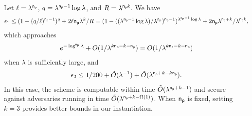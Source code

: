 

 Let $\ell=\lambda^{\mathsf{n_p}}$, $q=\lambda^{\mathsf{n_p}-1}\log\lambda$, and $R = \lambda^{\mathsf{n_p} k}$. We have 
$$\epsilon_1 \leq (1-(q/\ell)^{\mathsf{n_p}-1})^{q} + 2\ell\mathsf{n_p}\lambda^{k}/R = (1 - ((\lambda^{\mathsf{n_p}-1}\log\lambda)/\lambda^{\mathsf{n_p}})^{\mathsf{n_p}-1})^{\lambda^{\mathsf{n_p}-1}\log\lambda}+2\mathsf{n_p}\lambda^{\mathsf{n_p}+k}/\lambda^{\mathsf{n_p} k},$$ which approaches $$e^{-\log^{\mathsf{n_p}}\lambda} + O(1/\lambda^{k\mathsf{n_p}-k-\mathsf{n_p}}) = O(1/\lambda^{k\mathsf{n_p}-k-\mathsf{n_p}})$$ when $\lambda$ is sufficiently large, and
$$\epsilon_2 \leq 1/200 + \tilde{O}(\lambda^{-1})+\tilde{O}(\lambda^{\mathsf{n_p}+k-k\mathsf{n_p}}).$$
In this case, the scheme is computable within time
$\tilde{O}(\lambda^{\mathsf{n_p}+k-1})$ and secure against adversaries running in time $\tilde{O}(\lambda^{\mathsf{n_p}+k-\Omega(1)})$. When $\mathsf{n_p}$ is fixed, setting $k = 3$ provides better bounds in our instantiation.

